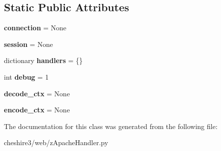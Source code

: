 \subsection*{Static Public Attributes}
\begin{DoxyCompactItemize}
\item 
\hypertarget{classcheshire3_1_1web_1_1z_apache_handler_1_1_z_handler_a34b7d7634fd6ad2588b840cfbdc4cb1d}{{\bfseries connection} = None}\label{classcheshire3_1_1web_1_1z_apache_handler_1_1_z_handler_a34b7d7634fd6ad2588b840cfbdc4cb1d}

\item 
\hypertarget{classcheshire3_1_1web_1_1z_apache_handler_1_1_z_handler_af0e8f8a998e1aba96f90860248b63030}{{\bfseries session} = None}\label{classcheshire3_1_1web_1_1z_apache_handler_1_1_z_handler_af0e8f8a998e1aba96f90860248b63030}

\item 
\hypertarget{classcheshire3_1_1web_1_1z_apache_handler_1_1_z_handler_ab80b6b10d6e0d52e7af8e58e6ec286e5}{dictionary {\bfseries handlers} = \{\}}\label{classcheshire3_1_1web_1_1z_apache_handler_1_1_z_handler_ab80b6b10d6e0d52e7af8e58e6ec286e5}

\item 
\hypertarget{classcheshire3_1_1web_1_1z_apache_handler_1_1_z_handler_ac60a13bac41fa8844232e91a0fae7e24}{int {\bfseries debug} = 1}\label{classcheshire3_1_1web_1_1z_apache_handler_1_1_z_handler_ac60a13bac41fa8844232e91a0fae7e24}

\item 
\hypertarget{classcheshire3_1_1web_1_1z_apache_handler_1_1_z_handler_aa41185489ffb1cdd0b6802605dad4ffe}{{\bfseries decode\-\_\-ctx} = None}\label{classcheshire3_1_1web_1_1z_apache_handler_1_1_z_handler_aa41185489ffb1cdd0b6802605dad4ffe}

\item 
\hypertarget{classcheshire3_1_1web_1_1z_apache_handler_1_1_z_handler_a2bc5274eb4cc4bd7e79fbbdac3951ea0}{{\bfseries encode\-\_\-ctx} = None}\label{classcheshire3_1_1web_1_1z_apache_handler_1_1_z_handler_a2bc5274eb4cc4bd7e79fbbdac3951ea0}

\end{DoxyCompactItemize}


The documentation for this class was generated from the following file\-:\begin{DoxyCompactItemize}
\item 
cheshire3/web/z\-Apache\-Handler.\-py\end{DoxyCompactItemize}
